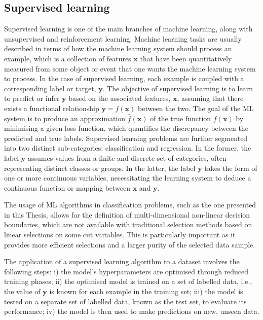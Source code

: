 \subsection{Supervised learning}
Supervised learning is one of the main branches of machine learning, along with unsupervised and reinforcement learning. Machine learning tasks are usually described in terms of how the machine learning system should process an example, which is a collection of features $\mathbf{x}$ that have been quantitatively measured from some object or event that one wants the machine learning system to process. In the case of supervised learning, each example is coupled with a corresponding label or target, $\mathbf{y}$. The objective of supervised learning is to learn to predict or infer $\mathbf{y}$ based on the associated features, $\mathbf{x}$, assuming that there exists a functional relationship $\mathbf{y} = f(\mathbf{x})$ between the two. The goal of the ML system is to produce an approximation $\widehat{f}(\mathbf{x})$ of the true function $f(\mathbf{x})$ by minimising a given loss function, which quantifies the discrepancy between the predicted and true labels. Supervised learning problems are further segmented into two distinct sub-categories: classification and regression. In the former, the label $\mathbf{y}$ assumes values from a finite and discrete set of categories, often representing distinct classes or groups. In the latter, the label $\mathbf{y}$ takes the form of one or more continuous variables, necessitating the learning system to deduce a continuous function or mapping between $\mathbf{x}$ and $\mathbf{y}$.

The usage of ML algorithms in classification problems, such as the one presented in this Thesis, allows for the definition of multi-dimensional non-linear decision boundaries, which are not available with traditional selection methods based on linear selections on some cut variables. This is particularly important as it provides more efficient selections and a larger purity of the selected data sample.

The application of a supervised learning algorithm to a dataset involves the following steps: i) the model's hyperparameters are optimised through reduced training phases; ii) the optimised model is trained on a set of labelled data, i.e., the value of $\mathbf{y}$ is known for each example in the training set; iii) the model is tested on a separate set of labelled data, known as the test set, to evaluate its performance; iv) the model is then used to make predictions on new, unseen data.

